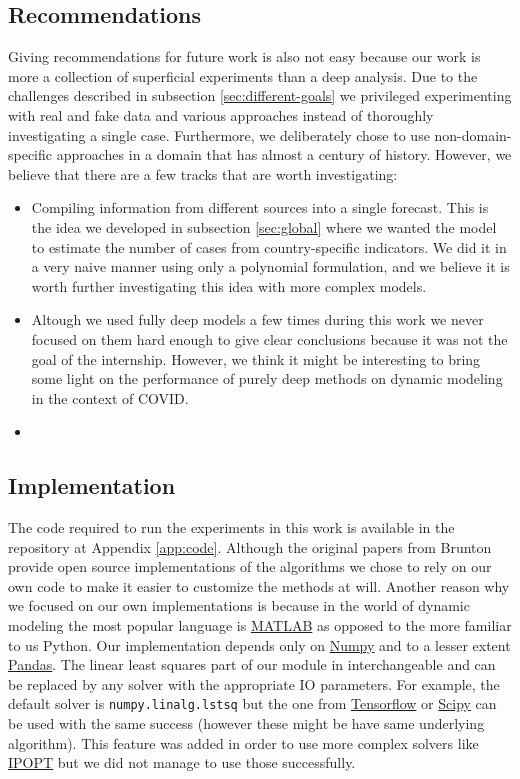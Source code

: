 \documentclass[12pt, letterpaper]{article}
\begin{document}
\subsection{Recommendations}

Giving recommendations for future work is also not easy because our work is more a collection of superficial experiments than a deep analysis. 
Due to the challenges described in subsection \ref{sec:different-goals} we privileged experimenting with real and fake data and various approaches instead of thoroughly investigating a single case. 
Furthermore, we deliberately chose to use non-domain-specific approaches in a domain that has almost a century of history.
However, we believe that there are a few tracks that are worth investigating:

\begin{itemize}
	\item Compiling information from different sources into a single forecast. This is the idea we developed in subsection \ref{sec:global} where we wanted the model to estimate the number of cases from country-specific indicators. 
	We did it in a very naive manner using only a polynomial formulation, and we believe it is worth further investigating this idea with more complex models. 
	\item Altough we used fully deep models a few times during this work we never focused on them hard enough to give clear conclusions because it was not the goal of the internship. However, we think it might be interesting to bring some light on the performance of purely deep methods on dynamic modeling in the context of COVID.
	\item 

\end{itemize}

\subsection{Implementation}

The code required to run the experiments in this work is available in the repository at Appendix \ref{app:code}. Although the original papers from Brunton \cite{sindy, sindy2} provide open source implementations of the algorithms we chose to rely on our own code to make it easier to customize the methods at will. 
Another reason why we focused on our own implementations is because in the world of dynamic modeling the most popular language is \href{https://www.mathworks.com/products/matlab.html}{MATLAB} as opposed to the more familiar to us Python.
Our implementation depends only on \href{https://numpy.org/doc/stable/index.html}{Numpy} and to a lesser extent \href{https://pandas.pydata.org/}{Pandas}.
The linear least squares part of our module in interchangeable and can be replaced by any solver with the appropriate IO parameters. 
For example, the default solver is \texttt{numpy.linalg.lstsq} but the one from \href{https://www.tensorflow.org/}{Tensorflow} or \href{https://www.scipy.org/}{Scipy} can be used with the same success (however these might be have same underlying algorithm).
This feature was added in order to use more complex solvers like \href{https://github.com/coin-or/Ipopt}{IPOPT} but we did not manage to use those successfully.
\end{document}
